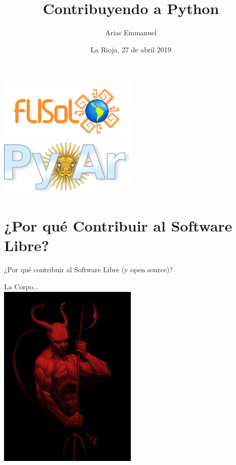 \documentclass[spanish]{beamer}
\title[Contribuyendo a Python]{Contribuyendo a Python}
\author{Arias Emmanuel}
\institute[Flisol 2019]{15º Festival Latinoamericano de Instalación de Software Libre}
\date{La Rioja,  27 de abril 2019}
\begin{document}

\begin{frame}
	\titlepage
	\includegraphics[width=0.5\textwidth]{flisol.png}
	\includegraphics[width=0.5\textwidth]{pyar.png}
\end{frame}

\section{¿Por qué Contribuir al Software Libre?}
\begin{frame}
 \begin{center}
	 ¿Por qué contribuir al Software Libre (y open source)? 
 \end{center}
\end{frame}

\begin{frame}
	\begin{center}
	La Corpo...\\
	\includegraphics[width=0.5\textwidth]{devil.jpeg}
	\end{center}
\end{frame}
\end{document}
